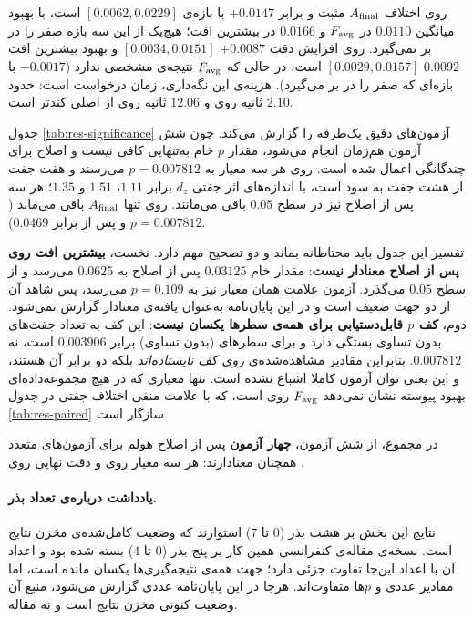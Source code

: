 

روی  اختلاف $A_{\mathrm{final}}$ مثبت و برابر $+0.0147$ با بازه‌ی $[0.0062,0.0229]$ است، با بهبود میانگین $0.0110$ در $F_{\mathrm{avg}}$ و $0.0166$ در بیشترین افت؛ هیچ‌یک از این سه بازه صفر را در بر نمی‌گیرد. روی  افزایش دقت $+0.0087$ $[0.0034,0.0151]$ و بهبود بیشترین افت $0.0092$ $[0.0029,0.0157]$ است، در حالی که $F_{\mathrm{avg}}$ نتیجه‌ی مشخصی ندارد ($-0.0017$ با بازه‌ای که صفر را در بر می‌گیرد). هزینه‌ی این نگه‌داری، زمان درخواست است:  حدود $2.10$ ثانیه روی  و $12.06$ ثانیه روی  از  اصلی کندتر است.

جدول \ref{tab:res-significance} آزمون‌های دقیق یک‌طرفه را گزارش می‌کند. چون شش آزمون هم‌زمان انجام می‌شود، مقدار $p$ خام به‌تنهایی کافی نیست و اصلاح  برای چندگانگی اعمال شده است. روی  هر سه معیار به $p=0.007812$ می‌رسند و هفت جفت از هشت جفت به سود  است، با اندازه‌های اثر جفتی $d_z$ برابر $1.11$، $1.51$ و $1.35$؛ هر سه پس از اصلاح  نیز در سطح $0.05$ باقی می‌مانند. روی  تنها $A_{\mathrm{final}}$ باقی می‌ماند ($p=0.007812$ و پس از  برابر $0.0469$).



تفسیر این جدول باید محتاطانه بماند و دو تصحیح مهم دارد. نخست، \textbf{بیشترین افت روی  پس از اصلاح  معنادار نیست}: مقدار خام $0.03125$ پس از اصلاح به $0.0625$ می‌رسد و از سطح $0.05$ می‌گذرد. آزمون علامت همان معیار نیز به $p=0.109$ می‌رسد، پس شاهد آن از دو جهت ضعیف است و در این پایان‌نامه به‌عنوان یافته‌ی معنادار گزارش نمی‌شود. دوم، \textbf{کف $p$ قابل‌دستیابی برای همه‌ی سطرها یکسان نیست}: این کف به تعداد جفت‌های بدون تساوی بستگی دارد و برای سطرهای  (بدون تساوی) برابر $0.003906$ است، نه $0.007812$. بنابراین مقادیر مشاهده‌شده‌ی  \emph{روی کف نایستاده‌اند} بلکه دو برابر آن هستند، و این یعنی توان آزمون کاملا اشباع نشده است. تنها معیاری که در هیچ مجموعه‌داده‌ای بهبود پیوسته نشان نمی‌دهد $F_{\mathrm{avg}}$ روی  است، که با علامت منفی اختلاف جفتی در جدول \ref{tab:res-paired} سازگار است.

در مجموع، از شش آزمون، \textbf{چهار آزمون} پس از اصلاح هولم برای آزمون‌های متعدد همچنان معنادارند: هر سه معیار روی  و دقت نهایی روی .

\paragraph{یادداشت درباره‌ی تعداد بذر.} نتایج این بخش بر هشت بذر ($0$ تا $7$) استوارند که وضعیت کامل‌شده‌ی مخزن نتایج است. نسخه‌ی مقاله‌ی کنفرانسی همین کار بر پنج بذر ($0$ تا $4$) بسته شده بود و اعداد آن با اعداد این‌جا تفاوت جزئی دارد؛ جهت همه‌ی نتیجه‌گیری‌ها یکسان مانده است، اما مقادیر عددی و $p$ها متفاوت‌اند. هرجا در این پایان‌نامه عددی گزارش می‌شود، منبع آن وضعیت کنونی مخزن نتایج است و نه مقاله.

